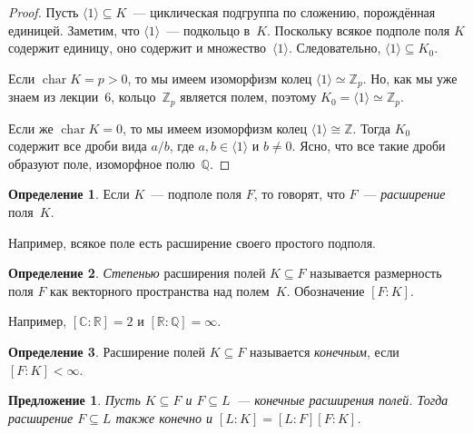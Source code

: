 \documentclass[a4paper,10pt]{amsart}
\newcommand{\xar}{\mathop{\mathrm{char}}}
\def\CC{{\mathbb C}}%
\def\ZZ{{\mathbb Z}}%
\def\RR{{\mathbb R}}%
\def\QQ{{\mathbb Q}}%
\newtheorem{proposition}{Предложение}
\theoremstyle{definition}
\newtheorem{definition}{Определение}
\theoremstyle{remark}
\begin{document}
\begin{proof}
	Пусть $\langle 1 \rangle \subseteq K$~--- циклическая подгруппа по
	сложению, порождённая единицей. Заметим, что $\langle 1 \rangle$~---
	подкольцо в~$K$. Поскольку всякое подполе поля $K$ содержит единицу,
	оно содержит и множество~$\langle 1 \rangle$. Следовательно,
	$\langle 1 \rangle \subseteq K_0$.
	
	Если $\xar K = p > 0$, то мы имеем изоморфизм колец $\langle 1
	\rangle \simeq \ZZ_p$. Но, как мы уже знаем из лекции~6,
	кольцо~$\ZZ_p$ является полем, поэтому $K_0 = \langle 1 \rangle
	\simeq \ZZ_p$.
	
	Если же $\xar K = 0$, то мы имеем изоморфизм колец $\langle 1
	\rangle \cong \ZZ$. Тогда $K_0$ содержит все дроби вида $a/b$, где
	$a,b \in \langle 1 \rangle$ и $b \ne 0$. Ясно, что все такие дроби
	образуют поле, изоморфное полю~$\QQ$.
\end{proof}

\begin{definition}
	Если $K$~--- подполе поля $F$, то говорят, что $F$~--- {\it
		расширение} поля~$K$.
\end{definition}

Например, всякое поле есть расширение своего простого подполя.

\begin{definition}
	{\it Степенью} расширения полей $K \subseteq F$ называется
	размерность поля $F$ как векторного пространства над полем~$K$.
	Обозначение $[F : K]$.
\end{definition}

Например, $[\CC : \RR] = 2$ и $[\RR : \QQ] = \infty$.

\begin{definition}
	Расширение полей $K\subseteq F$ называется {\it конечным}, если $[F
	: K] < \infty$.
\end{definition}

\begin{proposition}
	Пусть $K\subseteq F$ и $F\subseteq L$~--- конечные расширения полей.
	Тогда расширение $F\subseteq L$ также конечно и $[L:K]=[L:F][F:K]$.
\end{proposition}
\end{document}
